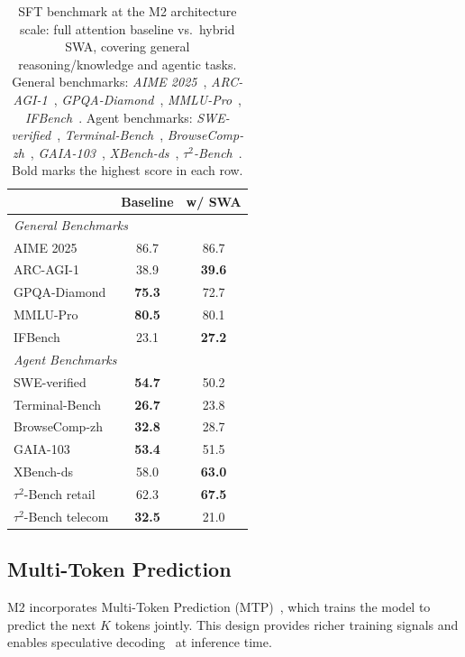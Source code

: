 \begin{table}[h]
\centering
\caption{SFT benchmark at the M2 architecture scale: full attention baseline vs.\ hybrid SWA, covering general reasoning/knowledge and agentic tasks. General benchmarks: \emph{AIME 2025}~\citep{aime2025}, \emph{ARC-AGI-1}~\citep{chollet2019arcagi}, \emph{GPQA-Diamond}~\citep{rein2024gpqa}, \emph{MMLU-Pro}~\citep{wang2024mmlu}, \emph{IFBench}~\citep{pyatkin2025ifbench}. Agent benchmarks: \emph{SWE-verified}~\citep{jimenez2024swebench}, \emph{Terminal-Bench}~\citep{merrill2026terminalbench}, \emph{BrowseComp-zh}~\citep{zhou2025browsecompzhbenchmarkingwebbrowsing}, \emph{GAIA-103}~\citep{mialon2024gaia}, \emph{XBench-ds}~\citep{chen2025xbench}, \emph{$\tau^2$-Bench}~\citep{barres2025tau2benchevaluatingconversationalagents}. Bold marks the highest score in each row.}
\label{tab:swa-sft-general}
\begin{tabular}{lcc}
\toprule
& \textbf{Baseline} & \textbf{w/ SWA} \\
\midrule
\multicolumn{3}{l}{\textit{General Benchmarks}} \\
AIME 2025 & 86.7 & 86.7 \\
ARC-AGI-1 & 38.9 & \textbf{39.6} \\
GPQA-Diamond & \textbf{75.3} & 72.7 \\
MMLU-Pro & \textbf{80.5} & 80.1 \\
IFBench & 23.1 & \textbf{27.2} \\
\midrule
\multicolumn{3}{l}{\textit{Agent Benchmarks}} \\
SWE-verified & \textbf{54.7} & 50.2 \\
Terminal-Bench & \textbf{26.7} & 23.8 \\
BrowseComp-zh & \textbf{32.8} & 28.7 \\
GAIA-103 & \textbf{53.4} & 51.5 \\
XBench-ds & 58.0 & \textbf{63.0} \\
$\tau^2$-Bench retail & 62.3 & \textbf{67.5} \\
$\tau^2$-Bench telecom & \textbf{32.5} & 21.0 \\
\bottomrule
\end{tabular}
\end{table}

\subsection{Multi-Token Prediction}
\label{sec:mtp}

M2 incorporates Multi-Token Prediction (MTP)~\citep{gloeckle2024better}, which trains the model to predict the next $K$ tokens jointly. This design provides richer training signals and enables speculative decoding~\citep{leviathan2023fast} at inference time.

